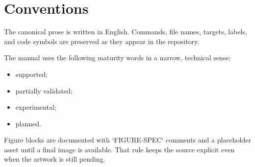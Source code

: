 \section*{Conventions}
\label{sec:front-matter-conventions}

The canonical prose is written in English. Commands, file names, targets, labels, and code symbols are preserved as they appear in the repository.

The manual uses the following maturity words in a narrow, technical sense:

\begin{itemize}
\item supported;
\item partially validated;
\item experimental;
\item planned.
\end{itemize}

Figure blocks are documented with `FIGURE-SPEC` comments and a placeholder asset until a final image is available. That rule keeps the source explicit even when the artwork is still pending.

